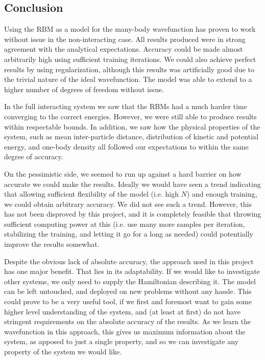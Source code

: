 \documentclass[a4paper, 11pt]{article}
\begin{document}
\begin{multicols}{2}

    \section{Conclusion}

    Using the RBM as a model for the many-body wavefunction has proven to work
    without issue in the non-interacting case. All results produced were in
    strong agreement with the analytical expectations. Accuracy could be made
    almost arbitrarily high using sufficient training iterations. We could also
    achieve perfect results by using regularization, although this results was
    artificially good due to the trivial nature of the ideal wavefunction. The
    model was able to extend to a higher number of degrees of freedom without
    issue. 

    In the full interacting system we saw that the RBMs had a much harder time
    converging to the correct energies. However, we were still able to produce
    results within respectable bounds. In addition, we saw how the physical
    properties of the system, such as mean inter-particle distance, distribution
    of kinetic and potential energy, and one-body density all followed our
    expectations to within the same degree of accuracy.

    On the pessimistic side, we seemed to run up against a hard barrier on how
    accurate we could make the results. Ideally we would have seen a trend
    indicating that allowing sufficient flexibility of the model (i.e. high $N$)
    and enough training, we could obtain arbitrary accuracy. We did not see such
    a trend. However, this has not been disproved by this project, and it is
    completely feasible that throwing sufficient computing power at this (i.e.
    use many more samples per iteration, stabilizing the training, and letting
    it go for a long as needed) could potentially improve the results somewhat. 

    Despite the obvious lack of absolute accuracy, the approach used in this
    project has one major benefit. That lies in its adaptability. If we would
    like to investigate other systems, we only need to supply the Hamiltonian
    describing it. The model can be left untouched, and deployed on new problems
    without any hassle. This could prove to be a very useful tool, if we first
    and foremost want to gain some higher level understanding of the system, and
    (at least at first) do not have stringent requirements on the absolute
    accuracy of the results. As we learn the wavefunction in this approach, this
    gives us maximum information about the system, as apposed to just a single
    property, and so we can investigate any property of the system we would
    like.


\end{multicols}
\end{document}
